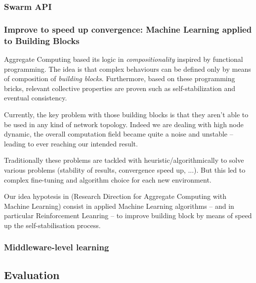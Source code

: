 \documentclass[11pt]{article}
\begin{document}
\subsubsection{Swarm API}
\subsubsection{Improve to speed up convergence: Machine Learning applied to Building Blocks}
Aggregate Computing based its logic in \textit{compositionality} inspired by functional programming. The idea is that complex behaviours can be defined only by means of composition of \emph{building blocks}. Furthermore, based on these programming bricks, relevant collective properties are proven such as self-stabilization and eventual consistency. 

Currently, the key problem with those building blocks is that they aren't able to be used in any kind of network topology. Indeed we are dealing with high node dynamic, the overall computation field became quite a noise and unstable -- leading to ever reaching our intended result.

Traditionally these problems are tackled with heuristic/algorithmically to solve various problems (stability of results, convergence speed up, ...). But this led to complex fine-tuning and algorithm choice for each new environment.

Our idea hypotesis in (Research Direction for Aggregate Computing with Machine Learning) consist in applied Machine Learning algorithms -- and in particular Reinforcement Leanring -- to improve building block by means of speed up the self-stabilisation process.
\subsubsection{Middleware-level learning}
\subsection{Evaluation}\label{evaluation}
\nocite{*}


\end{document}
